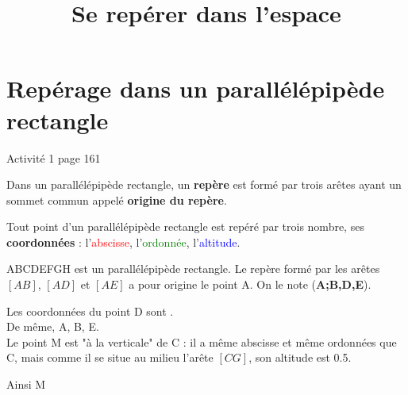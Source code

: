 \documentclass[12pt,a4paper]{article}
\date{}
\title{Se repérer dans l'espace}
\begin{document}
	\maketitle
	
	
	

\section{Repérage dans un parallélépipède rectangle}

\begin{myact}
	Activité 1 page 161
\end{myact}


\begin{mydef}

	Dans un parallélépipède rectangle, un \textbf{repère} est formé par trois arêtes ayant un sommet commun appelé \textbf{origine du repère}.

\end{mydef}

\begin{myprop}
	Tout point d'un parallélépipède rectangle est repéré par trois nombre, ses \textbf{coordonnées} : l'\textcolor{red}{abscisse}, l'\textcolor{green}{ordonnée}, l'\textcolor{blue}{altitude}.
\end{myprop}

\begin{myex}
	
	\begin{multicols}{2}
	ABCDEFGH est un parallélépipède rectangle. 
	Le repère formé par les arêtes $[AB]$, $[AD]$ et $[AE]$ a pour origine le point A. On le note (\textbf{A;B,D,E}).
	
	Les coordonnées du point D sont .\\
	
	De même, A, B, E.\\
	
	Le point M est "à la verticale" de C : il a même abscisse et même ordonnées que C, mais comme il se situe au milieu l'arête $[CG]$, son altitude est \num{0.5}. 
	
	Ainsi M
	\begin{center}
		
	\end{center} 
	\end{multicols}
\end{myex}
\end{document}
